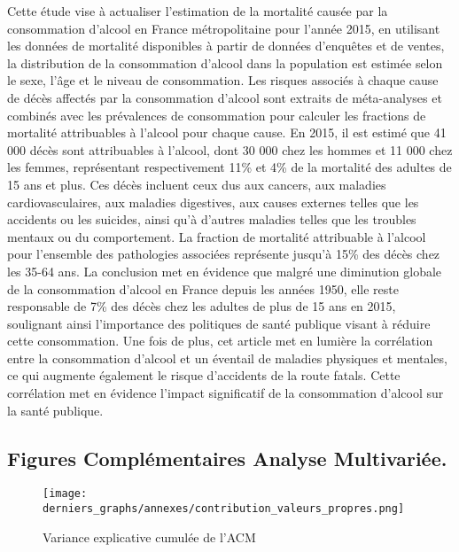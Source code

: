 \documentclass{article}
\begin{document}
Cette étude  vise à actualiser l'estimation de la mortalité causée par la consommation d'alcool en France métropolitaine pour l'année 2015, en utilisant les données de mortalité disponibles à partir de données d'enquêtes et de ventes, la distribution de la consommation d'alcool dans la population est estimée selon le sexe, l'âge et le niveau de consommation. Les risques associés à chaque cause de décès affectés par la consommation d'alcool sont extraits de méta-analyses et combinés avec les prévalences de consommation pour calculer les fractions de mortalité attribuables à l'alcool pour chaque cause. En 2015, il est estimé que 41 000 décès sont attribuables à l'alcool, dont 30 000 chez les hommes et 11 000 chez les femmes, représentant respectivement 11\% et 4\% de la mortalité des adultes de 15 ans et plus. Ces décès incluent ceux dus aux cancers, aux maladies cardiovasculaires, aux maladies digestives, aux causes externes telles que les accidents ou les suicides, ainsi qu'à d'autres maladies telles que les troubles mentaux ou du comportement. La fraction de mortalité attribuable à l'alcool pour l'ensemble des pathologies associées représente jusqu'à 15\% des décès chez les 35-64 ans. La conclusion met en évidence que malgré une diminution globale de la consommation d'alcool en France depuis les années 1950, elle reste responsable de 7\% des décès chez les adultes de plus de 15 ans en 2015, soulignant ainsi l'importance des politiques de santé publique visant à réduire cette consommation.
Une fois de plus, cet article met en lumière la corrélation entre la consommation d'alcool et un éventail de maladies physiques et mentales, ce qui augmente également le risque d'accidents de la route fatals. Cette corrélation met en évidence l'impact significatif de la consommation d'alcool sur la santé publique.



\newpage
\subsection{Figures Complémentaires Analyse Multivariée.}

\begin{figure}[H]
  \centering
  \texttt{[image: derniers\_graphs/annexes/contribution\_valeurs\_propres.png]} 
  \caption{Variance explicative cumulée de l'ACM }
  \label{fig:annexe1}
\end{figure}
\end{document}
